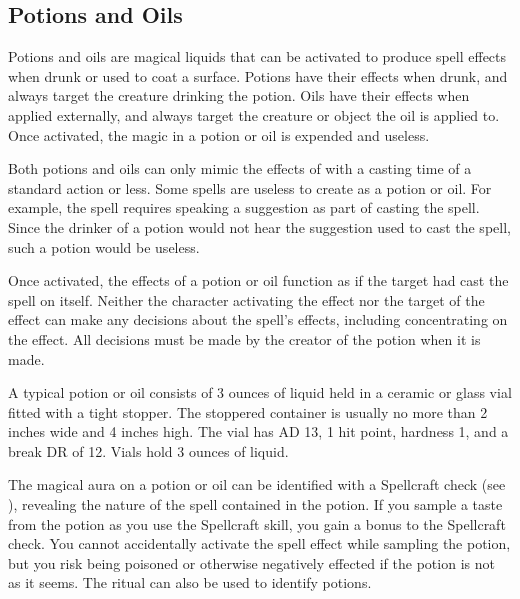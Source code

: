     \subsection{Potions and Oils}

        Potions and oils are magical liquids that can be activated to produce spell effects when drunk or used to coat a surface.
        Potions have their effects when drunk, and always target the creature drinking the potion.
        Oils have their effects when applied externally, and always target the creature or object the oil is applied to.
        Once activated, the magic in a potion or oil is expended and useless.

        Both potions and oils can only mimic the effects of  with a casting time of a standard action or less.
        Some spells are useless to create as a potion or oil.
        For example, the  spell requires speaking a suggestion as part of casting the spell.
        Since the drinker of a  potion would not hear the suggestion used to cast the spell, such a potion would be useless.

        Once activated, the effects of a potion or oil function as if the target had cast the spell on itself.
        Neither the character activating the effect nor the target of the effect can make any decisions about the spell's effects, including concentrating on the effect.
        All decisions must be made by the creator of the potion when it is made.

         A typical potion or oil consists of 3 ounces of liquid held in a ceramic or glass vial fitted with a tight stopper.
        The stoppered container is usually no more than 2 inches wide and 4 inches high.
        The vial has AD 13, 1 hit point, hardness 1, and a break DR of 12.
        Vials hold 3 ounces of liquid.

        The magical aura on a potion or oil can be identified with a Spellcraft check (see ), revealing the nature of the spell contained in the potion.
        If you sample a taste from the potion as you use the Spellcraft skill, you gain a  bonus to the Spellcraft check.
        You cannot accidentally activate the spell effect while sampling the potion, but you risk being poisoned or otherwise negatively effected if the potion is not as it seems.
        The  ritual can also be used to identify potions.

